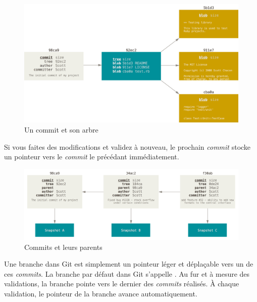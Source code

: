\begin{figure}[!h]
  \centering
  \includegraphics{images/commit-and-tree}
  \caption{Un commit et son arbre}
  \label{fig:git:commit-and-tree}
\end{figure}

Si vous faites des modifications et validez à nouveau, le prochain \emph{commit} stocke un pointeur vers le \emph{commit} le précédant immédiatement.

\begin{figure}[!h]
  \centering
  \includegraphics{images/commits-and-parents}
  \caption{Commits et leurs parents}
  \label{fig:git:commits-and-parents}
\end{figure}

Une branche dans Git est simplement un pointeur léger et déplaçable vers un de ces \emph{commits}.
La branche par défaut dans Git s'appelle .
Au fur et à mesure des validations, la branche  pointe vers le dernier des \emph{commits} réalisés.
À chaque validation, le pointeur de la branche  avance automatiquement.


